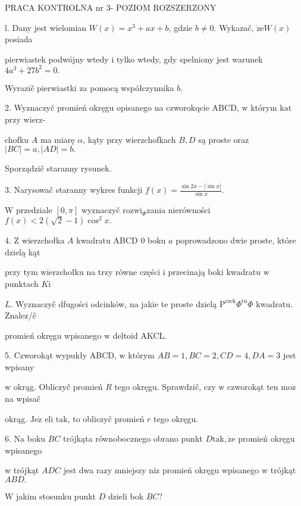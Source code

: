 \documentclass[a4paper,12pt]{article}
\begin{document}
PRACA KONTROLNA nr 3- POZIOM ROZSZERZONY

l. Dany jest wielomian $W(x) = x^{3}+ax+b$, gdzie $b \neq 0$. Wykazač, $\dot{\mathrm{z}}\mathrm{e} W(x)$ posiada

pierwiastek podwójny wtedy $\mathrm{i}$ tylko wtedy, gdy spelniony jest warunek $4a^{3}+27b^{2}=0.$

Wyrazič pierwiastki za pomocą współczynnika $b.$

2. Wyznaczyč promień okręgu opisanego na czworokqcie ABCD, $\mathrm{w}$ którym $\mathrm{k}\mathrm{a}\mathrm{t}$ przy wierz-

chofku $A$ ma miarę $\alpha$, kąty przy wierzchofkach $B, D$ są proste oraz $|BC|=a, |AD|=b.$

Sporządzič staranny rysunek.

3. Narysowač staranny wykres funkcji $f(x)=\displaystyle \frac{\sin 2x-|\sin x|}{\sin x}.$

$\mathrm{W}$ przedziale $[0,\pi]$ wyznaczyč $\mathrm{r}\mathrm{o}\mathrm{z}\mathrm{w}\mathrm{i}_{\Phi}$zania nierówności $f(x)<2(\sqrt{2}-1)\cos^{2}x.$

4. $\mathrm{Z}$ wierzchołka $A$ kwadratu ABCD $0$ boku $a$ poprowadzono dwie proste, które dzielą kąt

przy tym wierzchołku na trzy równe części $\mathrm{i}$ przecinają boki kwadratu $\mathrm{w}$ punktach $K\mathrm{i}$

$L$. Wyznaczyč dfugości odcinków, na jakie te proste dzielą $\mathrm{P}^{\mathrm{r}\mathrm{z}\mathrm{e}\mathrm{k}}\Phi^{\mathrm{t}\mathrm{n}}\Phi$ kwadratu. Znalez/č

promień okręgu wpisanego $\mathrm{w}$ deltoid AKCL.

5. Czworokąt wypukły ABCD, $\mathrm{w}$ którym $AB=1, BC=2, CD=4, DA=3$ jest wpisany

$\mathrm{w}$ okrąg. Obliczyč promień $R$ tego okręgu. Sprawdzič, czy $\mathrm{w}$ czworokąt ten $\mathrm{m}\mathrm{o}\dot{\mathrm{z}}$ na wpisač

okrąg. $\mathrm{J}\mathrm{e}\dot{\mathrm{z}}$ eli $\mathrm{t}\mathrm{a}\mathrm{k}$, to obliczyč promień $r$ tego okręgu.

6. Na boku $BC$ trójkąta równobocznego obrano punkt $D\mathrm{t}\mathrm{a}\mathrm{k}, \dot{\mathrm{z}}\mathrm{e}$ promień okręgu wpisanego

$\mathrm{w}$ trójkąt $ADC$ jest dwa razy mniejszy $\mathrm{n}\mathrm{i}\dot{\mathrm{z}}$ promień okręgu wpisanego $\mathrm{w}$ trójkąt $ABD.$

$\mathrm{W}$ jakim stosunku punkt $D$ dzieli bok $BC$?
\end{document}
